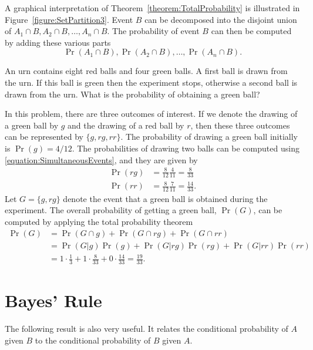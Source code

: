 A graphical interpretation of Theorem~\ref{theorem:TotalProbability} is illustrated in Figure~\ref{figure:SetPartition3}.
Event $B$ can be decomposed into the disjoint union of $A_1 \cap B, A_2 \cap B, \ldots, A_n \cap B$.
The probability of event $B$ can then be computed by adding these various parts
\begin{equation*}
\Pr (A_1 \cap B), \Pr (A_2 \cap B), \ldots, \Pr (A_n \cap B) .
\end{equation*}

\begin{example}
An urn contains eight red balls and four green balls.
A first ball is drawn from the urn.
If this ball is green then the experiment stops, otherwise a second ball is drawn from the urn.
What is the probability of obtaining a green ball?

In this problem, there are three outcomes of interest.
If we denote the drawing of a green ball by $g$ and the drawing of a red ball by $r$, then these three outcomes can be represented by $\{ g, rg, rr \}$.
The probability of drawing a green ball initially is $\Pr (g) = 4/12$.
The probabilities of drawing two balls can be computed using \eqref{equation:SimultaneousEvents}, and they are given by
\begin{align*}
\Pr (rg) &= \frac{8}{12} \frac{4}{11} = \frac{8}{33} \\
\Pr (rr) &= \frac{8}{12} \frac{7}{11} = \frac{14}{33} .
\end{align*}
Let $G = \{ g, rg \}$ denote the event that a green ball is obtained during the experiment.
The overall probability of getting a green ball, $\Pr (G)$, can be computed by applying the total probability theorem
\begin{equation*}
\begin{split}
\Pr (G) &= \Pr (G \cap g) + \Pr (G \cap rg) + \Pr (G \cap rr) \\
&= \Pr (G|g) \Pr(g) + \Pr (G|rg) \Pr(rg) + \Pr (G|rr) \Pr(rr) \\
&= 1 \cdot \frac{1}{3} + 1 \cdot \frac{8}{33} + 0 \cdot \frac{14}{33}
= \frac{19}{33} .
\end{split}
\end{equation*}
\end{example}


\section{Bayes' Rule}

The following result is also very useful.
It relates the conditional probability of $A$ given $B$ to the conditional probability of $B$ given $A$.

